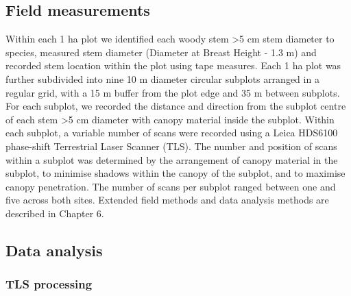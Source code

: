 \documentclass[11pt,a4paper]{article}
\begin{document}
\subsection{Field measurements}

Within each 1 ha plot we identified each woody stem >5 cm stem diameter to species, measured stem diameter (Diameter at Breast Height - 1.3 m) and recorded stem location within the plot using tape measures. Each 1 ha plot was further subdivided into nine 10 m diameter circular subplots arranged in a regular grid, with a 15 m buffer from the plot edge and 35 m between subplots. For each subplot, we recorded the distance and direction from the subplot centre of each stem >5 cm diameter with canopy material inside the subplot. Within each subplot, a variable number of scans were recorded using a Leica HDS6100 phase-shift Terrestrial Laser Scanner (TLS). The number and position of scans within a subplot was determined by the arrangement of canopy material in the subplot, to minimise shadows within the canopy of the subplot, and to maximise canopy penetration. The number of scans per subplot ranged between one and five across both sites. Extended field methods and data analysis methods are described in Chapter 6.

\subsection{Data analysis}

\subsubsection{TLS processing}
\end{document}
